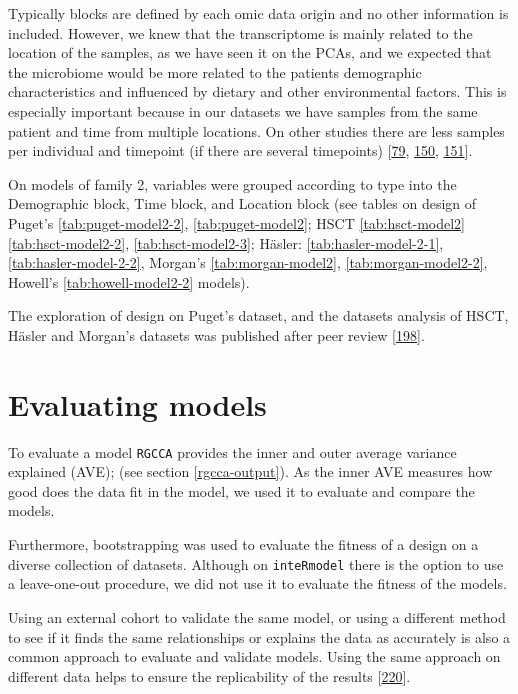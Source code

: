 \documentclass[
  12pt,
  a4paper,
  twoside,
  openright]{book}
\begin{document}
Typically blocks are defined by each omic data origin and no other information is included.
However, we knew that the transcriptome is mainly related to the location of the samples, as we have seen it on the PCAs, and we expected that the microbiome would be more related to the patients demographic characteristics and influenced by dietary and other environmental factors.
This is especially important because in our datasets we have samples from the same patient and time from multiple locations.
On other studies there are less samples per individual and timepoint (if there are several timepoints) {[}\protect\hyperlink{ref-hasler_uncoupling_2016}{79}, \protect\hyperlink{ref-morgan2015}{150}, \protect\hyperlink{ref-howell2018}{151}{]}.

On models of family 2, variables were grouped according to type into the Demographic block, Time block, and Location block (see tables on design of Puget's \ref{tab:puget-model2-2}, \ref{tab:puget-model2}; HSCT \ref{tab:hsct-model2} \ref{tab:hsct-model2-2}, \ref{tab:hsct-model2-3}; Häsler: \ref{tab:hasler-model-2-1}, \ref{tab:hasler-model-2-2}, Morgan's \ref{tab:morgan-model2}, \ref{tab:morgan-model2-2}, Howell's \ref{tab:howell-model2-2} models).

The exploration of design on Puget's dataset, and the datasets analysis of HSCT, Häsler and Morgan's datasets was published after peer review {[}\protect\hyperlink{ref-revilla2021}{198}{]}.

\hypertarget{evaluating-models}{%
\section{Evaluating models}\label{evaluating-models}}

To evaluate a model \texttt{RGCCA} provides the inner and outer average variance explained (AVE); (see section \ref{rgcca-output}).
As the inner AVE measures how good does the data fit in the model, we used it to evaluate and compare the models.

Furthermore, bootstrapping was used to evaluate the fitness of a design on a diverse collection of datasets.
Although on \texttt{inteRmodel} there is the option to use a leave-one-out procedure, we did not use it to evaluate the fitness of the models.

Using an external cohort to validate the same model, or using a different method to see if it finds the same relationships or explains the data as accurately is also a common approach to evaluate and validate models.
Using the same approach on different data helps to ensure the replicability of the results {[}\protect\hyperlink{ref-community2021}{220}{]}.
\end{document}

